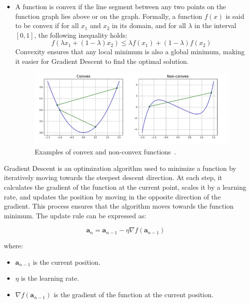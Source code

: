 \documentclass[12pt,a4paper]{report}
\begin{document}
\begin{itemize}
  \item A function is convex if the line segment between any two points on the function graph lies above or on the graph. Formally, a function \( f(x) \) is said to be convex if for all \( x_1 \) and \( x_2 \) in its domain, and for all \( \lambda \) in the interval \([0, 1]\), the following inequality holds:
        \begin{equation}
          f(\lambda x_1 + (1 - \lambda) x_2) \leq \lambda f(x_1) + (1 - \lambda) f(x_2)
        \end{equation}
        Convexity ensures that any local minimum is also a global minimum, making it easier for Gradient Descent to find the optimal solution.
        \begin{figure}[th]
          \centering
          \includegraphics[scale=0.637]{./pics/conv_unconv_func.png}
          \caption[Examples of non-differentiable functions]{Examples of convex and non-convex functions~\cite{gradientdescent}.}
          \label{fig:pic3}
        \end{figure}
\end{itemize}

Gradient Descent is an optimization algorithm used to minimize a function by iteratively moving towards the steepest descent direction. At each step, it calculates the gradient of the function at the current point, scales it by a learning rate, and updates the position by moving in the opposite direction of the gradient. This process ensures that the algorithm moves towards the function minimum. The update rule can be expressed as:

\begin{equation}
  \mathbf{a}_{n} = \mathbf{a}_{n-1} - \eta \nabla f(\mathbf{a}_{n-1})
\end{equation}

where:
\begin{itemize}
  \item $\mathbf{a}_{n-1}$ is the current position.
  \item $\eta$ is the learning rate.
  \item $\nabla f(\mathbf{a}_{n-1})$ is the gradient of the function at the current position.
\end{itemize}
\end{document}
